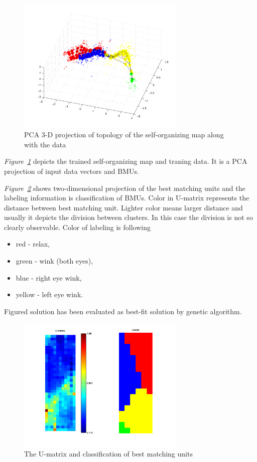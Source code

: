 \documentclass[a4paper]{IEEEtran}
\begin{document}
\begin{figure}[!h]
	\centering
	\includegraphics[width=80mm]{som_topol_proj}
	\caption{PCA 3-D projection of topology of the self-organizing map along with the data}
	\label{fig:som_topol_proj}
\end{figure}

\textit{Figure~\ref{fig:som_topol_proj}} depicts the trained self-organizing map and traning data.
It is a PCA projection of input data vectors and BMUs.

\textit{Figure~\ref{fig:som_umat}} shows two-dimensional projection of the best matching units and
the labeling information is classification of BMUs. 
Color in U-matrix represents the distance between best matching unit. Lighter color
means larger distance and usually it depicts the division between clusters. In this case
the division is not so clearly observable. Color of labeling is following
\begin{itemize}
	\item  red - relax,
	\item green - wink (both eyes),
	\item blue - right eye wink,
	\item yellow - left eye wink.
\end{itemize}

Figured solution has been evaluated as best-fit solution by genetic algorithm.
\begin{figure}[!h]
	\centering
	\includegraphics[width=80mm]{som_umat}
	\caption{The U-matrix and classification of best matching units}
	\label{fig:som_umat}
\end{figure}
\end{document}
